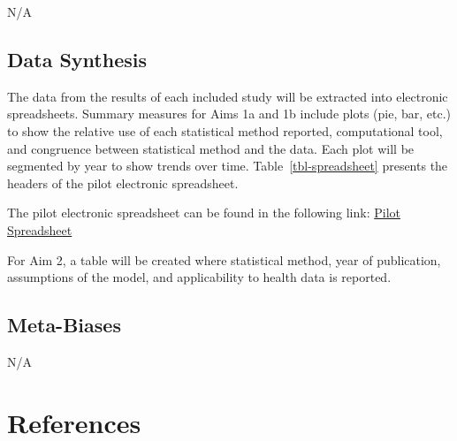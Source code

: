 \documentclass[
]{article}
\begin{document}
N/A

\hypertarget{data-synthesis}{%
\subsection{Data Synthesis}\label{data-synthesis}}

The data from the results of each included study will be extracted into
electronic spreadsheets. Summary measures for Aims 1a and 1b include
plots (pie, bar, etc.) to show the relative use of each statistical
method reported, computational tool, and congruence between statistical
method and the data. Each plot will be segmented by year to show trends
over time. Table~\ref{tbl-spreadsheet} presents the headers of the pilot
electronic spreadsheet.

The pilot electronic spreadsheet can be found in the following link:
\href{https://udemontreal-my.sharepoint.com/:x:/g/personal/ariel_mundo_ortiz_umontreal_ca/EUr53h3HnMBLhRohYMqYmp0Bzf1UY7ncKTvm2RkPf9Wt3w?e=cMdhdw}{Pilot Spreadsheet}

For Aim 2, a table will be created where statistical method, year of
publication, assumptions of the model, and applicability to health data
is reported.

\hypertarget{meta-biases}{%
\subsection{Meta-Biases}\label{meta-biases}}

N/A

\hypertarget{references}{%
\section{References}\label{references}}
\end{document}

